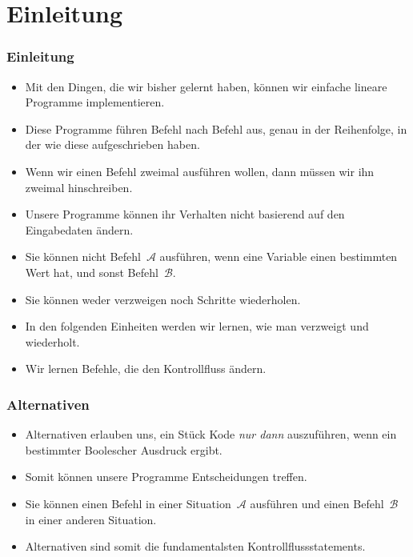 \documentclass[aspectratio=169,mathserif,notheorems]{beamer}%
\subtitle{22.~Alternativen~mit~\texttt{if}}%
\begin{document}
%
%
\startPresentation%
%
\section{Einleitung}%
\begin{frame}[t]%
\frametitle{Einleitung}%
%
\begin{itemize}%
\item Mit den Dingen, die wir bisher gelernt haben, können wir einfache lineare Programme implementieren.%
\item<2-> Diese Programme führen Befehl nach Befehl aus, genau in der Reihenfolge, in der wie diese aufgeschrieben haben.%
\item<3-> Wenn wir einen Befehl zweimal ausführen wollen, dann müssen wir ihn zweimal hinschreiben.%
\item<4-> Unsere Programme können ihr Verhalten nicht basierend auf den Eingabedaten ändern.%
\item<5-> Sie können nicht Befehl~$\mathcal{A}$ ausführen, wenn eine Variable einen bestimmten Wert hat, und sonst Befehl~$\mathcal{B}$.%
\item<6-> Sie können weder verzweigen noch Schritte wiederholen.%
\item<7-> In den folgenden Einheiten werden wir lernen, wie man verzweigt und wiederholt.%
\item<8-> Wir lernen Befehle, die den Kontrollfluss ändern.%
%
\end{itemize}%
\end{frame}%
%
\begin{frame}%
\frametitle{Alternativen}%
\begin{itemize}%
\item Alternativen erlauben uns, ein Stück Kode \emph{nur dann} auszuführen, wenn ein bestimmter Boolescher Ausdruck  ergibt.%
%
\item<2-> Somit können unsere Programme Entscheidungen treffen.%
%
\item<3-> Sie können einen Befehl in einer Situation~$\mathcal{A}$ ausführen und einen Befehl~$\mathcal{B}$ in einer anderen Situation.%
%
\item<4-> Alternativen sind somit die fundamentalsten Kontrollflussstatements.%
\end{itemize}%
\end{frame}%
%
\end{document}
